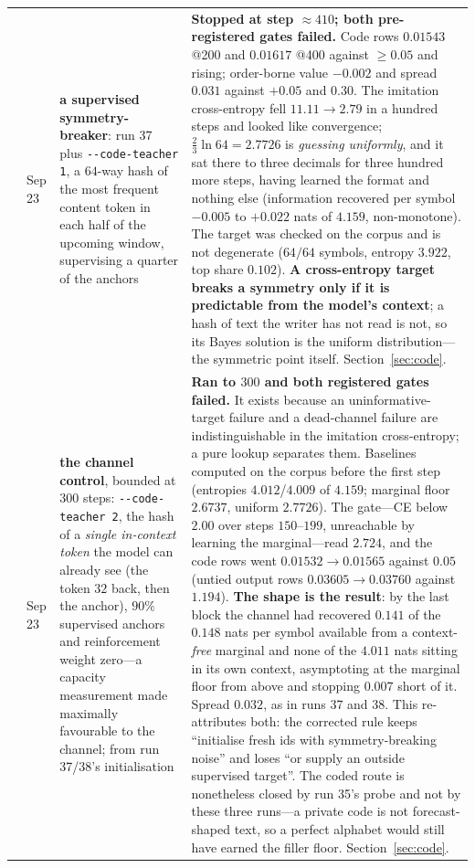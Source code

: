 \documentclass{article} %
\begin{document}
{\begin{longtable}{@{}llp{3.6cm}p{5.6cm}@{}}
\addlinespace
38 & Sep 23 & \textbf{a supervised symmetry-breaker}: run 37 plus \texttt{-{}-code-teacher 1}, a $64$-way hash of the most frequent content token in each half of the upcoming window, supervising a quarter of the anchors & \textbf{Stopped at step ${\approx}410$; both pre-registered gates failed.} Code rows $0.01543$ @200 and $0.01617$ @400 against $\ge 0.05$ and rising; order-borne value $-0.002$ and spread $0.031$ against $+0.05$ and $0.30$. The imitation cross-entropy fell $11.11 \to 2.79$ in a hundred steps and looked like convergence; $\tfrac{2}{3}\ln 64 = 2.7726$ is \emph{guessing uniformly}, and it sat there to three decimals for three hundred more steps, having learned the format and nothing else (information recovered per symbol $-0.005$ to $+0.022$ nats of $4.159$, non-monotone). The target was checked on the corpus and is not degenerate ($64/64$ symbols, entropy $3.922$, top share $0.102$). \textbf{A cross-entropy target breaks a symmetry only if it is predictable from the model's context}; a hash of text the writer has not read is not, so its Bayes solution is the uniform distribution---the symmetric point itself. Section~\ref{sec:code}. \\
\addlinespace
39 & Sep 23 & \textbf{the channel control}, bounded at $300$ steps: \texttt{-{}-code-teacher 2}, the hash of a \emph{single in-context token} the model can already see (the token $32$ back, then the anchor), $90\%$ supervised anchors and reinforcement weight zero---a capacity measurement made maximally favourable to the channel; from run 37/38's initialisation & \textbf{Ran to $300$ and both registered gates failed.} It exists because an uninformative-target failure and a dead-channel failure are indistinguishable in the imitation cross-entropy; a pure lookup separates them. Baselines computed on the corpus before the first step (entropies $4.012$/$4.009$ of $4.159$; marginal floor $2.6737$, uniform $2.7726$). The gate---CE below $2.00$ over steps $150$--$199$, unreachable by learning the marginal---read $2.724$, and the code rows went $0.01532 \to 0.01565$ against $0.05$ (untied output rows $0.03605 \to 0.03760$ against $1.194$). \textbf{The shape is the result}: by the last block the channel had recovered $0.141$ of the $0.148$ nats per symbol available from a context-\emph{free} marginal and none of the $4.011$ nats sitting in its own context, asymptoting at the marginal floor from above and stopping $0.007$ short of it. Spread $0.032$, as in runs 37 and 38. This re-attributes both: the corrected rule keeps ``initialise fresh ids with symmetry-breaking noise'' and loses ``or supply an outside supervised target''. The coded route is nonetheless closed by run 35's probe and not by these three runs---a private code is not forecast-shaped text, so a perfect alphabet would still have earned the filler floor. Section~\ref{sec:code}. \\

\end{longtable}}
\end{document}
